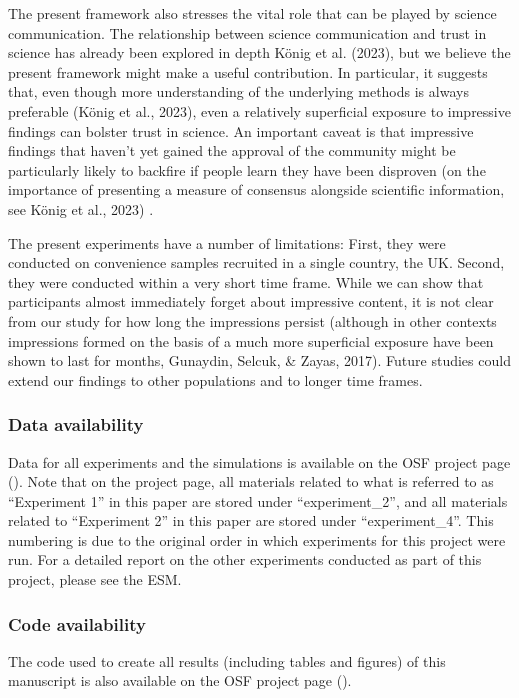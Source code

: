 \documentclass[
  doc,floatsintext]{apa6}
\begin{document}
The present framework also stresses the vital role that can be played by science communication. The relationship between science communication and trust in science has already been explored in depth König et al. (2023), but we believe the present framework might make a useful contribution. In particular, it suggests that, even though more understanding of the underlying methods is always preferable (König et al., 2023), even a relatively superficial exposure to impressive findings can bolster trust in science. An important caveat is that impressive findings that haven't yet gained the approval of the community might be particularly likely to backfire if people learn they have been disproven (on the importance of presenting a measure of consensus alongside scientific information, see König et al., 2023) .

The present experiments have a number of limitations: First, they were conducted on convenience samples recruited in a single country, the UK. Second, they were conducted within a very short time frame. While we can show that participants almost immediately forget about impressive content, it is not clear from our study for how long the impressions persist (although in other contexts impressions formed on the basis of a much more superficial exposure have been shown to last for months, Gunaydin, Selcuk, \& Zayas, 2017). Future studies could extend our findings to other populations and to longer time frames.

\subsubsection{Data availability}\label{data-availability}

Data for all experiments and the simulations is available on the OSF project page (). Note that on the project page, all materials related to what is referred to as ``Experiment 1'' in this paper are stored under ``experiment\_2'', and all materials related to ``Experiment 2'' in this paper are stored under ``experiment\_4''. This numbering is due to the original order in which experiments for this project were run. For a detailed report on the other experiments conducted as part of this project, please see the ESM.

\subsubsection{Code availability}\label{code-availability}

The code used to create all results (including tables and figures) of this manuscript is also available on the OSF project page ().
\end{document}
